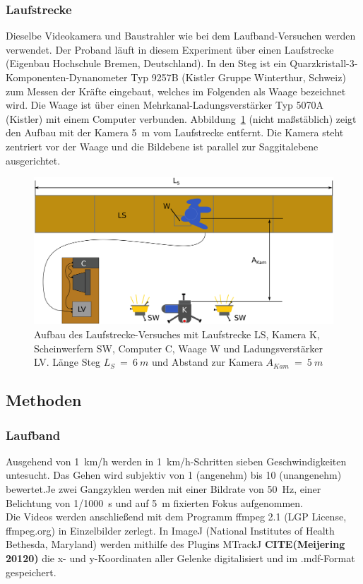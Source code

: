 \subsubsection{Laufstrecke}
Dieselbe Videokamera und Baustrahler wie bei dem Laufband-Versuchen werden verwendet. Der Proband läuft in diesem Experiment über einen Laufstrecke (Eigenbau Hochschule Bremen, Deutschland). In den Steg ist ein Quarzkristall-3-Komponenten-Dynanometer Typ 9257B (Kistler Gruppe Winterthur, Schweiz) zum Messen der Kräfte eingebaut, welches im Folgenden als Waage bezeichnet wird. Die Waage ist über einen Mehrkanal-Ladungsverstärker Typ 5070A (Kistler) mit einem Computer verbunden. Abbildung~\ref{fig:laufstg_stp} (nicht maßstäblich) zeigt den Aufbau mit der Kamera 5~m vom Laufstrecke entfernt. Die Kamera steht zentriert vor der Waage und die Bildebene ist parallel zur Saggitalebene ausgerichtet.
\begin{figure}[h!]
	\centering
	\includegraphics[width=0.7\linewidth]{bilder/mat_met/Laufstrecke_setup}
	\caption[Aufbau Laufstrecke Versuch]{Aufbau des Laufstrecke-Versuches mit Laufstrecke LS, Kamera K, Scheinwerfern SW, Computer C, Waage W und Ladungsverstärker LV. Länge Steg $L_S~=~6~m$ und Abstand zur Kamera $A_{Kam}~=~5~m$}
	\label{fig:laufstg_stp}
\end{figure}

\subsection{Methoden}
\subsubsection{Laufband}
Ausgehend von 1~km/h werden in 1~km/h-Schritten sieben Geschwindigkeiten untesucht. Das Gehen wird subjektiv von 1 (angenehm) bis 10 (unangenehm) bewertet.Je zwei Gangzyklen werden mit einer Bildrate von 50~Hz, einer Belichtung von 1/1000~s und auf 5~m fixierten Fokus aufgenommen.\\
Die Videos werden anschließend mit dem Programm ffmpeg 2.1 (LGP License, ffmpeg.org) in Einzelbilder zerlegt. In ImageJ (National Institutes of Health Bethesda, Maryland) werden mithilfe des Plugins MTrackJ \textbf{CITE(Meijering 20120)} die x- und y-Koordinaten aller Gelenke digitalisiert und im .mdf-Format gespeichert.


